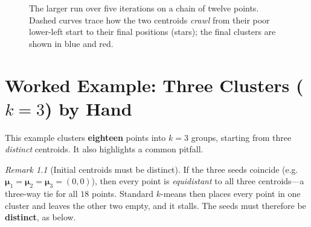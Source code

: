 \documentclass[11pt,a4paper]{report}
\theoremstyle{definition}
\theoremstyle{plain}
\theoremstyle{remark}
\newtheorem*{remark}{Remark}
\newcommand{\vmu}{\bm{\mu}}
\begin{document}
	\begin{figure}[ht]
	\centering
	\caption{The larger run over five iterations on a chain of twelve points. Dashed
	curves trace how the two centroids \emph{crawl} from their poor lower-left start
	to their final positions (stars); the final clusters are shown in blue and red.}
	\label{fig:kmeans2}
	\end{figure}
	
	\chapter{Worked Example: Three Clusters ($k=3$) by Hand}
	\label{ch:worked3}
	
	This example clusters \textbf{eighteen} points into $k=3$ groups, starting from
	three \emph{distinct} centroids. It also highlights a common pitfall.
	
	\begin{remark}[Initial centroids must be distinct]
	If the three seeds coincide (e.g.\ $\vmu_1=\vmu_2=\vmu_3=(0,0)$), then every
	point is \emph{equidistant} to all three centroids---a three-way tie for all
	$18$ points. Standard $k$-means then places every point in one cluster and
	leaves the other two empty, and it stalls. The seeds must therefore be
	\textbf{distinct}, as below.
	\end{remark}
	
\end{document}
